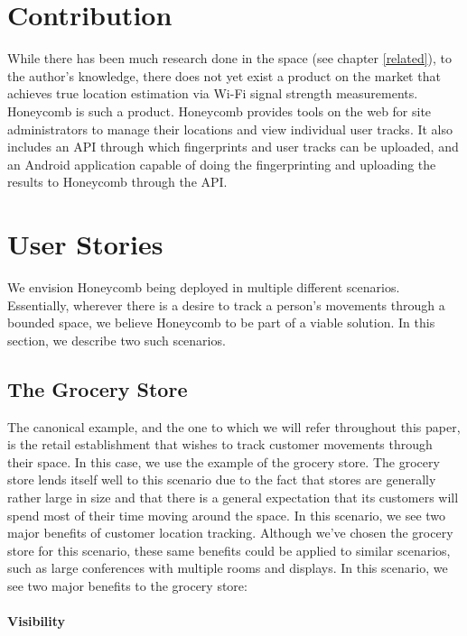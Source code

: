  
\section{Contribution}
%

While there has been much research done in the space (see chapter \ref{related}), to the author's knowledge, there does not yet exist a product on the market that achieves true location estimation via Wi-Fi signal strength measurements. Honeycomb is such a product. Honeycomb provides tools on the web for site administrators to manage their locations and view individual user tracks. It also includes an API through which fingerprints and user tracks can be uploaded, and an Android application capable of doing the fingerprinting and uploading the results to Honeycomb through the API. 


\section{User Stories}
%

We envision Honeycomb being deployed in multiple different scenarios. Essentially, wherever there is a desire to track a person's movements through a bounded space, we believe Honeycomb to be part of a viable solution. In this section, we describe two such scenarios.

\subsection{The Grocery Store}
The canonical example, and the one to which we will refer throughout this paper, is the retail establishment that wishes to track customer movements through their space. In this case, we use the example of the grocery store. The grocery store lends itself well to this scenario due to the fact that stores are generally rather large in size and that there is a general expectation that its customers will spend most of their time moving around the space. In this scenario, we see two major benefits of customer location tracking.  Although we've chosen the grocery store for this scenario, these same benefits could be applied to similar scenarios, such as large conferences with multiple rooms and displays. In this scenario, we see two major benefits to the grocery store: 

\paragraph{Visibility}

